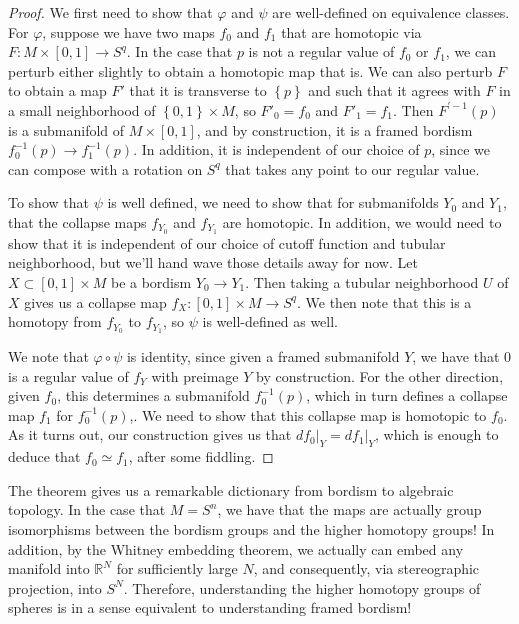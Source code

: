 \documentclass[psamsfonts]{amsart}
\theoremstyle{definition}
\theoremstyle{remark}
\newcommand{\R}{\mathbb{R}}
\newcommand{\inv}{^{-1}}
\newcommand{\set}[1]{\left\lbrace #1 \right\rbrace}
\begin{document}
\begin{proof}
We first need to show that $\varphi$ and $\psi$ are well-defined on equivalence classes. For $\varphi$, suppose we have two maps $f_0$ and $f_1$ that are homotopic via $F : M \times [0,1] \to S^q$. In the case that $p$ is not a regular value of $f_0$ or $f_1$, we can perturb either slightly to obtain a homotopic map that is. We can also perturb $F$ to obtain a map $F'$ that it is transverse to $\set{p}$ and such that it agrees with $F$ in a small neighborhood of $\set{0,1} \times M$, so $F'_0 = f_0$ and $F'_1 = f_1$. Then $F^{'-1}(p)$ is a submanifold of $M \times [0,1]$, and by construction, it is a framed bordism $f_0\inv(p) \to f_1\inv(p)$. In addition, it is independent of our choice of $p$, since we can compose with a rotation on $S^q$ that takes any point to our regular value.

To show that $\psi$ is well defined, we need to show that for submanifolds $Y_0$ and $Y_1$, that the collapse maps $f_{Y_0}$ and $f_{Y_1}$ are homotopic. In addition, we would need to show that it is independent of our choice of cutoff function and tubular neighborhood, but we'll hand wave those details away for now. Let $X \subset [0,1] \times M$ be a bordism $Y_0 \to Y_1$. Then taking a tubular neighborhood $U$ of $X$ gives us a collapse map $f_X : [0,1] \times M \to S^q$. We then note that this is a homotopy from $f_{Y_0}$ to $f_{Y_1}$, so $\psi$ is well-defined as well.

We note that $\varphi \circ \psi$ is identity, since given a framed submanifold $Y$, we have that $0$ is a regular value of $f_Y$ with preimage $Y$ by construction. For the other direction, given $f_0$, this determines a submanifold $f_0\inv(p)$, which in turn defines a collapse map $f_1$ for $f_0\inv(p)$,. We need to show that this collapse map is homotopic to $f_0$. As it turns out, our construction gives us that $df_0\vert_Y = df_1\vert_Y$, which is enough to deduce that $f_0 \simeq f_1$, after some fiddling.
\end{proof}
The theorem gives us a remarkable dictionary from bordism to algebraic topology. In the case that $M = S^n$, we have that the maps are actually group isomorphisms between the bordism groups and the higher homotopy groups! In addition, by the Whitney embedding theorem, we actually can embed any manifold into $\R^N$ for sufficiently large $N$, and consequently, via stereographic projection, into $S^N$. Therefore, understanding the higher homotopy groups of spheres is in a sense equivalent to understanding framed bordism!
%
\end{document}
